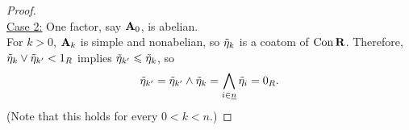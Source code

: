\begin{proof}
    \\[5pt]
    \noindent \underline{Case 2:} 
    One factor, say $\mathbf{A}_0$, is abelian.\\
    For $k > 0$, $\mathbf{A}_k$ is simple and nonabelian, so $\tilde{\eta}_k$ is a coatom of $\operatorname{Con}\mathbf{R}$.
    Therefore, 
    $\tilde{\eta}_k \vee \tilde{\eta}_{k'} < 1_R$ implies
    $\tilde{\eta}_{k'}\leqslant \tilde{\eta}_k$, %
    so
    \begin{equation}
      \label{eq:110}
      \etaR_{k'}= \etaR_{k'} \meet \etaR_k = \Meet_{i\in \nn}\etaR_i = 0_R.
    \end{equation}
    (Note that this holds for every $0<k<n$.)


\end{proof}
